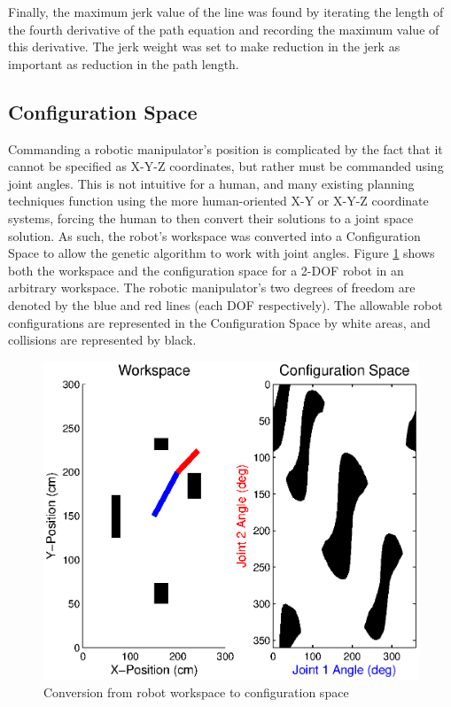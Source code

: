 Finally, the maximum jerk value of the line was found by iterating the length of the fourth derivative of the path equation and recording the maximum value of this derivative. The jerk weight was set to make reduction in the jerk as important as reduction in the path length.

\subsection{Configuration Space}
Commanding a robotic manipulator's position is complicated by the fact that it cannot be specified as X-Y-Z coordinates, but rather must be commanded using joint angles. This is not intuitive for a human, and many existing planning techniques function using the more human-oriented X-Y or X-Y-Z coordinate systems, forcing the human to then convert their solutions to a joint space solution. As such, the robot's workspace was converted into a Configuration Space to allow the genetic algorithm to work with joint angles. Figure \ref{fig:ws2cs} shows both the workspace and the configuration space for a 2-DOF robot in an arbitrary workspace. The robotic manipulator's two degrees of freedom are denoted by the blue and red lines (each DOF respectively). The allowable robot configurations are represented in the Configuration Space by white areas, and collisions are represented by black.

\begin{figure}[h]
	\centering
	\includegraphics[width=\figWidth]{./figures/wp2cs.eps}
	\caption{Conversion from robot workspace to configuration space }
	\label{fig:ws2cs}
\end{figure}

